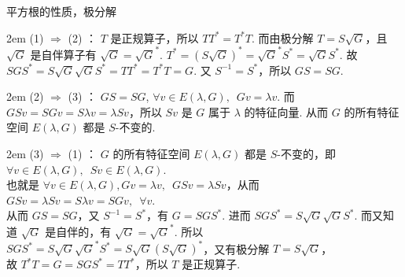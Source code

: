 \documentclass[UTF8,14pt,normal]{ctexart}
\begin{document}
 平方根的性质，极分解

    \hangindent 2em
    \noindent 
    (1) $ \Rightarrow $ (2) ： $ T $ 是正规算子，所以 $ TT^{*} = T^{*}T$. 而由极分解 $ T = S\sqrt{G}$，且 $ \sqrt{G} $ 是自伴算子有 $ \sqrt{G} = \sqrt{G}^{*}$.
    $ T^{*} = (S\sqrt{G})^{*} = \sqrt{G}^{*}S^{*} = \sqrt{G}S^{*}$. 故 $ SGS^{*} = S\sqrt{G}\sqrt{G}S^{*} = TT^{*} = T^{*}T = G$. 又 $S^{-1} = S^{*}$，所以 $ GS = SG $.

    \hangindent 2em
    \noindent 
    (2) $ \Rightarrow $ (3) ： $ GS = SG $, $\forall v \in E(\lambda, G), \enspace Gv = \lambda v$.
    而 $ GSv = SGv = S \lambda v = \lambda Sv$，所以 $ Sv $ 是 $ G $ 属于 $ \lambda $ 的特征向量. 从而 $ G $ 的所有特征空间 $E(\lambda, G)$ 都是 $ S $-不变的.

    \hangindent 2em
    \noindent 
    (3) $ \Rightarrow $ (1) ： $ G $ 的所有特征空间 $E(\lambda, G)$ 都是 $ S $-不变的，即 $\forall v \in E(\lambda, G), \enspace Sv \in E(\lambda, G)$. \\
    也就是 $\forall v \in E(\lambda, G), Gv = \lambda v, \enspace GSv = \lambda Sv$，从而 $GSv = \lambda Sv = S \lambda v = SGv, \enspace \forall v$. \\
    从而 $ GS = SG $，又 $S^{-1} = S^{*}$，有 $ G = SGS^{*} $. 进而 $ SGS^{*} = S\sqrt{G}\sqrt{G}S^{*} $. 而又知道 $\sqrt{G}$ 是自伴的，有 $ \sqrt{G} = \sqrt{G}^{*} $. 
    所以 $ SGS^{*} = S\sqrt{G}\sqrt{G}^{*}S^{*} = S\sqrt{G}(S\sqrt{G})^{*}$，又有极分解 $ T = S\sqrt{G} $，\\ 
    故 $T^{*}T = G = SGS^{*} = TT^{*}$，所以 $ T $ 是正规算子.
\end{document}
